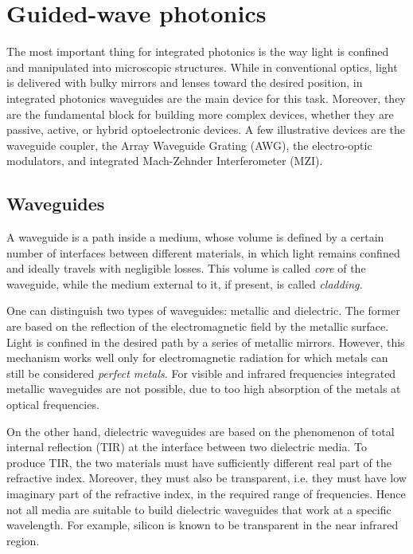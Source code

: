 \clearpage
\section{Guided-wave photonics}
\label{sec:guided-wave_photonics}
The most important thing for integrated photonics is the way light is confined and manipulated into microscopic structures.
While in conventional optics, light is delivered with bulky mirrors and lenses toward the desired position, in integrated photonics waveguides are the main device for this task.
Moreover, they are the fundamental block for building more complex devices, whether they are passive, active, or hybrid optoelectronic devices.
A few illustrative devices are the waveguide coupler, the Array Waveguide Grating (AWG), the electro-optic modulators, and integrated Mach-Zehnder Interferometer (MZI).


\subsection{Waveguides}
\label{ssec:waveguides}
A waveguide is a path inside a medium, whose volume is defined by a certain number of interfaces between different materials, in which light remains confined and ideally travels with negligible losses.
This volume is called \textit{core} of the waveguide, while the medium external to it, if present, is called \textit{cladding.}

One can distinguish two types of waveguides: metallic and dielectric.
The former are based on the reflection of the electromagnetic field by the metallic surface.
Light is confined in the desired path by a series of metallic mirrors.
However, this mechanism works well only for electromagnetic radiation for which metals can still be considered \textit{perfect metals}.
For visible and infrared frequencies integrated metallic waveguides are not possible, due to too high absorption of the metals at optical frequencies.

On the other hand, dielectric waveguides are based on the phenomenon of total internal reflection (TIR) at the interface between two dielectric media.
To produce TIR, the two materials must have sufficiently different real part of the refractive index.
Moreover, they must also be transparent, i.e. they must have low imaginary part of the refractive index, in the required range of frequencies.
Hence not all media are suitable to build dielectric waveguides that work at a specific wavelength.
For example, silicon is known to be transparent in the near infrared region.


